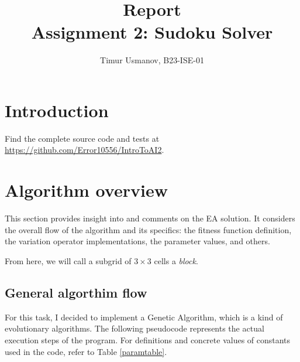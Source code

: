\documentclass[10pt]{article}
\begin{document}
\title{Report\\Assignment 2: Sudoku Solver}
\author{Timur Usmanov, B23-ISE-01}
\maketitle

\section{Introduction}
Find the complete source code and tests at \url{https://github.com/Error10556/IntroToAI2}.

\section{Algorithm overview}

This section provides insight into and comments on the EA solution. It considers
the overall flow of the algorithm and its specifics: the fitness function definition,
the variation operator implementations, the parameter values, and others.

From here, we will call a subgrid of $3\times3$ cells a \textit{block}.

\subsection{General algorthim flow}\label{flowlisting}

For this task, I decided to implement a Genetic Algorithm, which is a kind of evolutionary algorithms.
The following pseudocode represents the actual execution steps of the program. For definitions and
concrete values of constants used in the code, refer to Table \ref{paramtable}.
\end{document}

